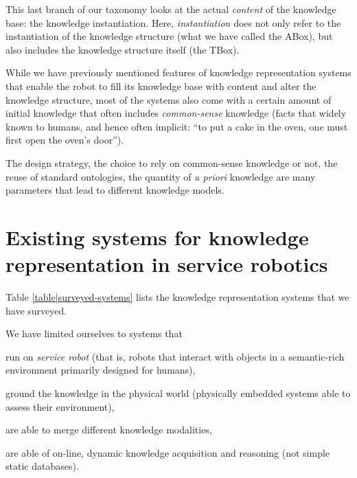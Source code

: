 This last branch of our taxonomy looks at the actual \emph{content} of the
knowledge base: the knowledge instantiation. Here, \emph{instantiation} does
not only refer to the instantiation of the knowledge structure (what we have
called the ABox), but also includes the knowledge structure itself (the TBox).

While we have previously mentioned features of knowledge representation systems
that enable the robot to fill its knowledge base with content and alter the
knowledge structure, most of the systems also come with a certain amount of
initial knowledge that often includes \emph{common-sense} knowledge (\ie facts
that widely known to humans, and hence often implicit: ``to put a cake in the
oven, one must first open the oven's door'').

The design strategy, the choice to rely on common-sense knowledge or not, the
reuse of standard ontologies, the quantity of {\it a priori} knowledge are many
parameters that lead to different knowledge models.


\section{Existing systems for knowledge representation in service robotics}
\label{sect|surveyed-systems}


Table \ref{table|surveyed-systems} lists the knowledge representation
systems that we have surveyed.

We have limited ourselves to systems that
\begin{inparaenum} 
    \item  run on \emph{service robot} (that is, robots that interact with 
    objects in a semantic-rich environment primarily designed for humans),
    \item  ground the knowledge in the physical world (physically embedded
    systems able to assess their environment),
    \item  are able to merge different knowledge modalities,
    \item  are able of on-line, dynamic knowledge acquisition and reasoning 
    (\ie not simple static databases).
\end{inparaenum}


